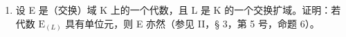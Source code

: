 \BourbakiExercisesSection

\begin{enumerate}
\def\labelenumi{\arabic{enumi}.}
\tightlist
\item
  设 E 是（交换）域 K 上的一个代数，且 L 是 K 的一个交换扩域。证明：若代数 \(\mathrm{E}_{(L)}\) 具有单位元，则 E 亦然（参见 II，§ 3，第 5 号，命题 6）。
\end{enumerate}

